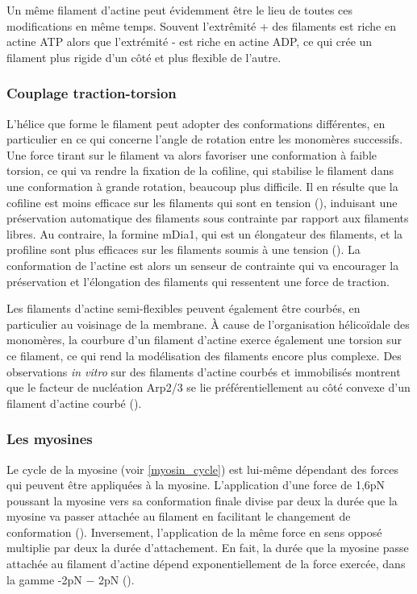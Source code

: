 \documentclass{report}
\begin{document}
Un même filament d'actine peut évidemment être le lieu de toutes ces modifications en même temps. Souvent l'extrêmité + des filaments est riche en actine ATP alors que l'extrémité - est riche en actine ADP, ce qui crée un filament plus rigide d'un côté et plus flexible de l'autre. 

\subsubsection{Couplage traction-torsion}

L'hélice que forme le filament peut adopter des conformations différentes, en particulier en ce qui concerne l'angle de rotation entre les monomères successifs. 
Une force tirant sur le filament va alors favoriser une conformation à faible torsion, ce qui va rendre la fixation de la cofiline, qui stabilise le filament dans une conformation à grande rotation, beaucoup plus difficile. 
Il en résulte que la cofiline est moins efficace sur les filaments qui sont en tension (\cite{hayakawa_actin_2011}), induisant une préservation automatique des filaments sous contrainte par rapport aux filaments libres. 
Au contraire, la formine mDia1, qui est un élongateur des filaments, et la profiline sont plus efficaces sur les filaments soumis à une tension (\cite{higashida_f-_2013}). 
La conformation de l'actine est alors un senseur de contrainte qui va encourager la préservation et l'élongation des filaments qui ressentent une force de traction. 

Les filaments d'actine semi-flexibles peuvent également être courbés, en particulier au voisinage de la membrane. 
À cause de l'organisation hélicoïdale des monomères, la courbure d'un filament d'actine exerce également une torsion sur ce filament, ce qui rend la modélisation des filaments encore plus complexe. 
Des observations \textit{in vitro} sur des filaments d'actine courbés et immobilisés montrent que le facteur de nucléation Arp2/3 se lie préférentiellement au côté convexe d'un filament d'actine courbé (\cite{risca_actin_2012}). 

\subsubsection{Les myosines}

Le cycle de la myosine (voir \ref{myosin_cycle}) est lui-même dépendant des forces qui peuvent être appliquées à la myosine. 
L'application d'une force de 1,6pN poussant la myosine vers sa conformation finale divise par deux la durée que la myosine va passer attachée au filament en facilitant le changement de conformation (\cite{veigel_load-dependent_2003}). 
Inversement, l'application de la même force en sens opposé multiplie par deux la durée d'attachement. 
En fait, la durée que la myosine passe attachée au filament d'actine dépend exponentiellement de la force exercée, dans la gamme -2pN $-$ 2pN (\cite{veigel_load-dependent_2003}). 
\end{document}
